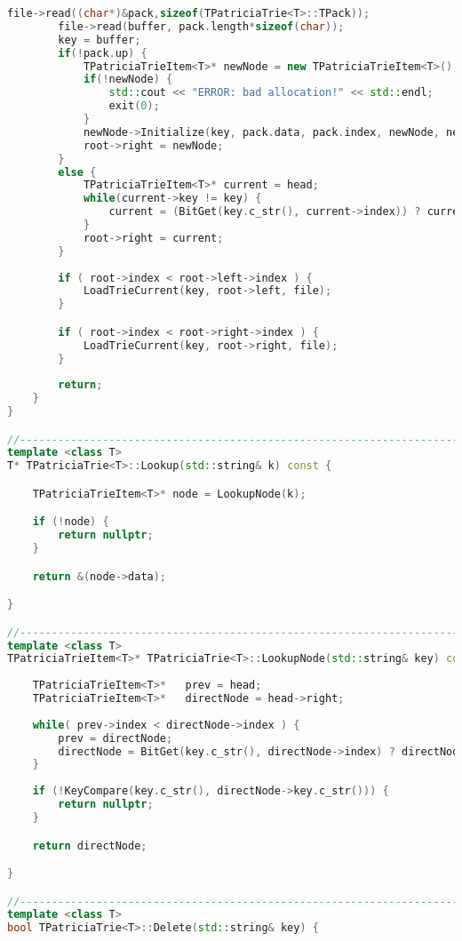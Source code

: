 \begin{lstlisting}[language=C++]
        file->read((char*)&pack,sizeof(TPatriciaTrie<T>::TPack));
        file->read(buffer, pack.length*sizeof(char));
        key = buffer;
        if(!pack.up) {
            TPatriciaTrieItem<T>* newNode = new TPatriciaTrieItem<T>();
            if(!newNode) {
                std::cout << "ERROR: bad allocation!" << std::endl;
                exit(0);
            }
            newNode->Initialize(key, pack.data, pack.index, newNode, newNode);
            root->right = newNode;
        }
        else {
            TPatriciaTrieItem<T>* current = head;
            while(current->key != key) {
                current = (BitGet(key.c_str(), current->index)) ? current->right : current->left;
            }
            root->right = current;
        }
        
        if ( root->index < root->left->index ) {
            LoadTrieCurrent(key, root->left, file);
        }

        if ( root->index < root->right->index ) {
            LoadTrieCurrent(key, root->right, file);
        }
        
        return;
    }
}

//----------------------------------------------------------------------------
template <class T>
T* TPatriciaTrie<T>::Lookup(std::string& k) const {

    TPatriciaTrieItem<T>* node = LookupNode(k);

    if (!node) {
        return nullptr;
    }

    return &(node->data);

}

//----------------------------------------------------------------------------
template <class T>
TPatriciaTrieItem<T>* TPatriciaTrie<T>::LookupNode(std::string& key) const {
    
    TPatriciaTrieItem<T>*   prev = head;
    TPatriciaTrieItem<T>*   directNode = head->right;
    
    while( prev->index < directNode->index ) {
        prev = directNode;
        directNode = BitGet(key.c_str(), directNode->index) ? directNode->right : directNode->left;
    }
    
    if (!KeyCompare(key.c_str(), directNode->key.c_str())) {
        return nullptr;
    }

    return directNode;

}

//----------------------------------------------------------------------------
template <class T>
bool TPatriciaTrie<T>::Delete(std::string& key) {
    

\end{lstlisting}
